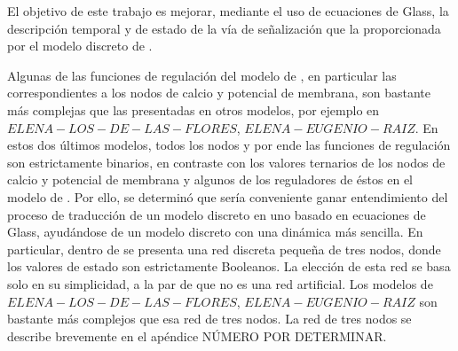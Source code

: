 El objetivo de este trabajo es mejorar, mediante el uso de ecuaciones de Glass, la descripción temporal y de estado de la vía de señalización que la proporcionada por el modelo discreto de \citeauthor{Espinal2011} \citep{Espinal2011}. 

Algunas de las funciones de regulación del modelo de \citeauthor{Espinal2011} \citep{Espinal2011}, en particular las correspondientes a los nodos de calcio y potencial de membrana, son bastante más complejas que las presentadas en otros modelos, por ejemplo en $ELENA-LOS-DE-LAS-FLORES$, $ELENA-EUGENIO-RAIZ$. En estos dos últimos modelos, todos los nodos y por ende las funciones de regulación son estrictamente binarios, en contraste con los valores ternarios de los nodos de calcio y potencial de membrana y algunos de los reguladores de éstos en el modelo de \citeauthor{Espinal2011}. Por ello, se determinó que sería conveniente ganar entendimiento del proceso de traducción de un modelo discreto en uno basado en ecuaciones de Glass, ayudándose de un modelo discreto con una dinámica más sencilla. En particular, dentro de  \citeauthor{Reka3Nodos2010} \citep{Reka3Nodos2010} se presenta una red discreta pequeña de tres nodos, donde los valores de estado son estrictamente Booleanos. La elección de esta red se basa solo en su simplicidad, a la par de que no es una red artificial. Los  modelos de $ELENA-LOS-DE-LAS-FLORES$, $ELENA-EUGENIO-RAIZ$ son bastante más complejos que esa red de tres nodos. La red de tres nodos se describe brevemente en el apéndice NÚMERO POR DETERMINAR.


